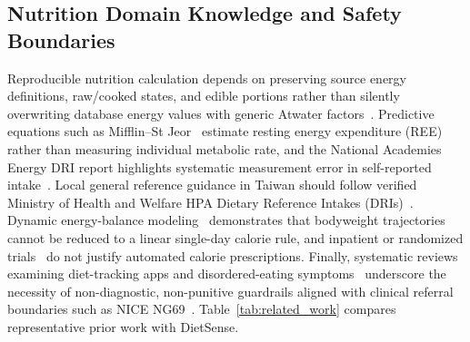 \documentclass[conference]{IEEEtran}
\begin{document}
\subsection{Nutrition Domain Knowledge and Safety Boundaries}
Reproducible nutrition calculation depends on preserving source energy definitions, raw/cooked states, and edible portions rather than silently overwriting database energy values with generic Atwater factors~\cite{fda_cfr1019}. Predictive equations such as Mifflin--St Jeor~\cite{mifflin1990ree} estimate resting energy expenditure (REE) rather than measuring individual metabolic rate, and the National Academies Energy DRI report highlights systematic measurement error in self-reported intake~\cite{nasem2023dri}. Local general reference guidance in Taiwan should follow verified Ministry of Health and Welfare HPA Dietary Reference Intakes (DRIs)~\cite{hpa_dri8}. Dynamic energy-balance modeling~\cite{hall2011bodyweight} demonstrates that bodyweight trajectories cannot be reduced to a linear single-day calorie rule, and inpatient or randomized trials~\cite{hall2019ultraprocessed,gardner2018dietfits,zeevi2015personalized} do not justify automated calorie prescriptions. Finally, systematic reviews examining diet-tracking apps and disordered-eating symptoms~\cite{roth2024selfmonitoring,anderberg2025apps} underscore the necessity of non-diagnostic, non-punitive guardrails aligned with clinical referral boundaries such as NICE NG69~\cite{nice2020ng69}. Table~\ref{tab:related_work} compares representative prior work with DietSense.
\end{document}

